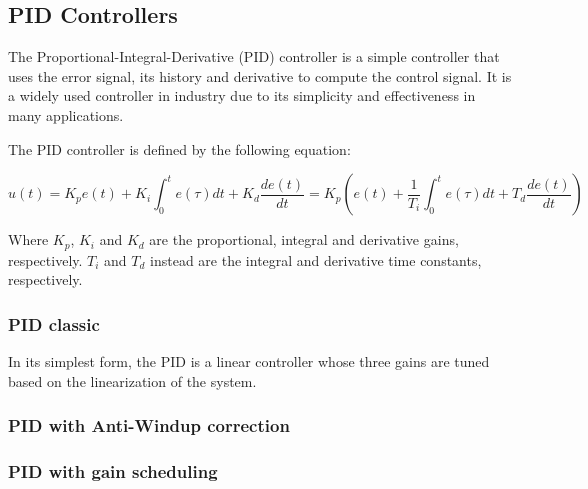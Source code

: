 \subsection{PID Controllers}
\label{subsec:pid_controllers}

The Proportional-Integral-Derivative (PID) controller is a simple controller that uses the error signal, its history and derivative to compute the control signal.
It is a widely used controller in industry due to its simplicity and effectiveness in many applications.

The PID controller is defined by the following equation:

\begin{equation}
    u(t) = K_p e(t) + K_i \int_{0}^{t} e(\tau)dt + K_d \frac{de(t)}{dt} = K_p \left(e(t) + \frac{1}{T_i} \int_{0}^{t} e(\tau)dt + T_d \frac{de(t)}{dt}\right)
\end{equation}

Where $K_p$, $K_i$ and $K_d$ are the proportional, integral and derivative gains, respectively.
$T_i$ and $T_d$ instead are the integral and derivative time constants, respectively.


\subsubsection{PID classic}
\label{subsubsec:pid_classic}

In its simplest form, the PID is a linear controller whose three gains are tuned based on the linearization of the system.



\subsubsection{PID with Anti-Windup correction}
\label{subsubsec:pid_anti_windup}



\subsubsection{PID with gain scheduling}
\label{subsubsec:pid_gain_scheduling}
